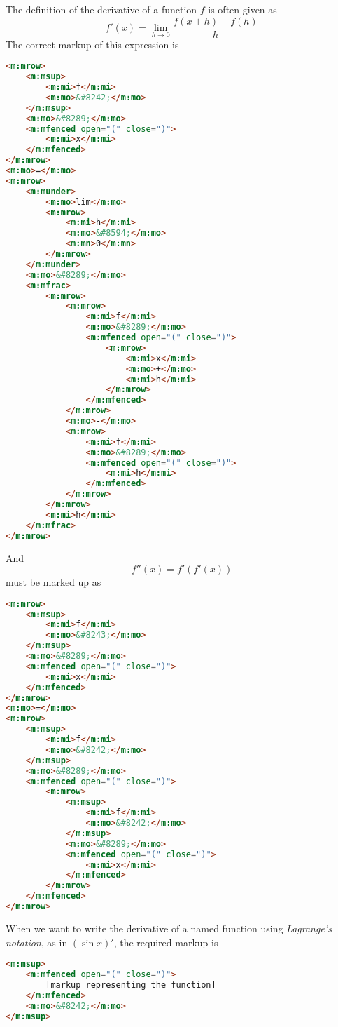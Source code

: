 \documentclass[english,a4paper,11pt]{article}
\begin{document}
\begin{examples}
The definition of the derivative of a function $f$ is often given as
\begin{equation}
f'(x) = \lim_{h \rightarrow 0} \frac{f(x+h) - f(h)}{h}
\end{equation}
The correct markup of this expression is 
\begin{lstlisting}[language=HTML]
<m:mrow>
	<m:msup>
		<m:mi>f</m:mi>
		<m:mo>&#8242;</m:mo>
	</m:msup>
	<m:mo>&#8289;</m:mo>
	<m:mfenced open="(" close=")">
		<m:mi>x</m:mi>
	</m:mfenced>
</m:mrow>
<m:mo>=</m:mo>
<m:mrow>
	<m:munder>
		<m:mo>lim</m:mo>
		<m:mrow>
			<m:mi>h</m:mi>
			<m:mo>&#8594;</m:mo>
			<m:mn>0</m:mn>
		</m:mrow>
	</m:munder>
	<m:mo>&#8289;</m:mo>
	<m:mfrac>
		<m:mrow>
			<m:mrow>
				<m:mi>f</m:mi>
				<m:mo>&#8289;</m:mo>
				<m:mfenced open="(" close=")">
					<m:mrow>
						<m:mi>x</m:mi>
						<m:mo>+</m:mo>
						<m:mi>h</m:mi>
					</m:mrow>
				</m:mfenced>
			</m:mrow>
			<m:mo>-</m:mo>
			<m:mrow>
				<m:mi>f</m:mi>
				<m:mo>&#8289;</m:mo>
				<m:mfenced open="(" close=")">
					<m:mi>h</m:mi>
				</m:mfenced>
			</m:mrow>
		</m:mrow>
		<m:mi>h</m:mi>
	</m:mfrac>
</m:mrow>
\end{lstlisting}
And
\begin{equation}
f''(x) = f'(f'(x))
\end{equation}
must be marked up as
\begin{lstlisting}[language=HTML]
<m:mrow>
	<m:msup>
		<m:mi>f</m:mi>
		<m:mo>&#8243;</m:mo>
	</m:msup>
	<m:mo>&#8289;</m:mo>
	<m:mfenced open="(" close=")">
		<m:mi>x</m:mi>
	</m:mfenced>
</m:mrow>
<m:mo>=</m:mo>
<m:mrow>
	<m:msup>
		<m:mi>f</m:mi>
		<m:mo>&#8242;</m:mo>
	</m:msup>
	<m:mo>&#8289;</m:mo>
	<m:mfenced open="(" close=")">
		<m:mrow>
			<m:msup>
				<m:mi>f</m:mi>
				<m:mo>&#8242;</m:mo>
			</m:msup>
			<m:mo>&#8289;</m:mo>
			<m:mfenced open="(" close=")">
				<m:mi>x</m:mi>
			</m:mfenced>
		</m:mrow>
	</m:mfenced>
</m:mrow>
\end{lstlisting}

\end{examples}

\bigskip
When we want to write the derivative of a named function using \emph{Lagrange's notation}, as in $(\sin x)'$, the required markup is

\begin{lstlisting}[language=HTML]
<m:msup>
	<m:mfenced open="(" close=")">
		[markup representing the function]
	</m:mfenced>
	<m:mo>&#8242;</m:mo>
</m:msup>
\end{lstlisting}
\end{document}
